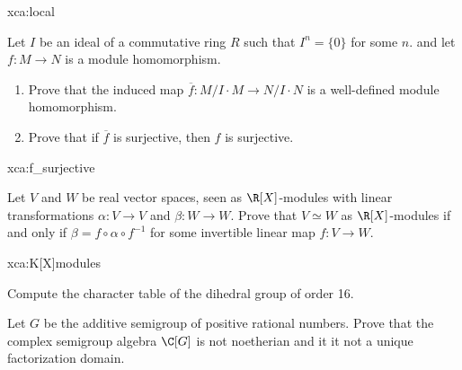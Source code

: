 \begin{sol}{xca:local}

\end{sol}

\begin{exercise}
\label{xca:f_surjective}
    Let $I$ be an ideal of a commutative ring $R$ such that $I^n=\{0\}$ for some $n$. 
    and let $f\colon M\to N$ is a module homomorphism.
    \begin{enumerate} 
    \item Prove that the induced map 
    $\overline{f}\colon M/I\cdot M\to N/I\cdot N$ is a well-defined module
    homomorphism. 
    \item Prove that if $\overline{f}$ is surjective, then $f$ is surjective.
    \end{enumerate}
\end{exercise}

\begin{sol}{xca:f_surjective}
\end{sol}

\begin{exercise}
\label{xca:K[X]modules}
    Let $V$ and $W$ be real vector spaces, seen as $\R[X]$-modules
    with linear transformations $\alpha\colon V\to V$ and $\beta\colon W\to W$. Prove
    that $V\simeq W$ as $\R[X]$-modules if and only if $\beta=f\circ \alpha\circ f^{-1}$ 
    for some invertible linear map $f\colon V\to W$. 
\end{exercise}

\begin{sol}{xca:K[X]modules}
\end{sol}

\begin{exercise}
    Compute the character table of the dihedral group of order 16. 
\end{exercise}

\begin{exercise}
    Let $G$ be the additive semigroup of positive rational numbers. Prove that 
    the complex semigroup algebra $\C[G]$ is not noetherian 
    and it it not a unique factorization domain. 
\end{exercise}